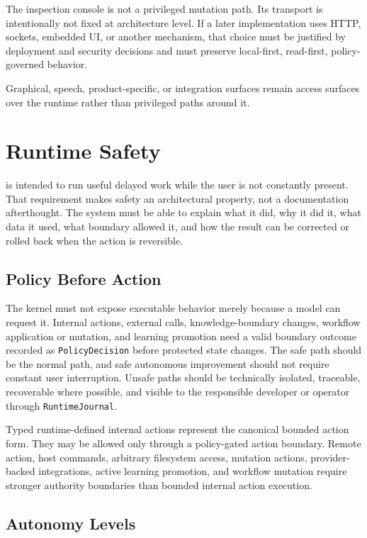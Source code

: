 \documentclass[11pt]{report}
\begin{document}
The inspection console is not a privileged mutation path. Its transport is intentionally not fixed at architecture level. If a later implementation uses HTTP, sockets, embedded UI, or another mechanism, that choice must be justified by deployment and security decisions and must preserve local-first, read-first, policy-governed behavior.

Graphical, speech, product-specific, or integration surfaces remain access surfaces over the runtime rather than privileged paths around it.


\section{Runtime Safety}

\Madre is intended to run useful delayed work while the user is not constantly present. That requirement makes safety an architectural property, not a documentation afterthought. The system must be able to explain what it did, why it did it, what data it used, what boundary allowed it, and how the result can be corrected or rolled back when the action is reversible.

\subsection{Policy Before Action}

The kernel must not expose executable behavior merely because a model can request it. Internal actions, external calls, knowledge-boundary changes, workflow application or mutation, and learning promotion need a valid boundary outcome recorded as \texttt{PolicyDecision} before protected state changes. The safe path should be the normal path, and safe autonomous improvement should not require constant user interruption. Unsafe paths should be technically isolated, traceable, recoverable where possible, and visible to the responsible developer or operator through \texttt{RuntimeJournal}.

Typed runtime-defined internal actions represent the canonical bounded action form. They may be allowed only through a policy-gated action boundary. Remote action, host commands, arbitrary filesystem access, mutation actions, provider-backed integrations, active learning promotion, and workflow mutation require stronger authority boundaries than bounded internal action execution.

\subsection{Autonomy Levels}
\end{document}
